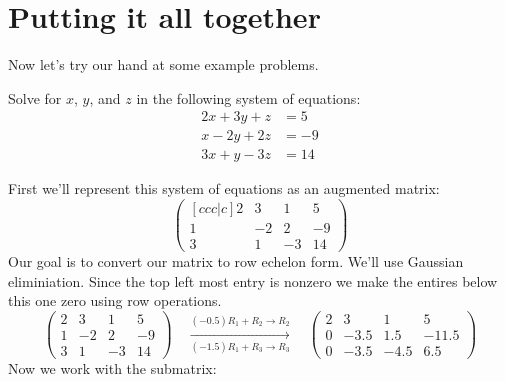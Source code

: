 \documentclass{ximera}
\begin{document}
\section{Putting it all together}

Now let's try our hand at some example problems.


\begin{example}
  Solve for $x$, $y$, and $z$ in the following system of equations:
  \begin{align*}
    2x + 3y + z  &= 5 \\
    x -2y+ 2z &=-9\\
    3x +y- 3z &=14
  \end{align*}

\begin{explanation}
First we'll represent this system of equations as an augmented matrix:
\[
  \begin{pmatrix}[ccc|c]
    2 & 3 & 1 & 5 \\
    1 &  -2 & 2 &-9 \\
    3 &  1 & -3 & 14
  \end{pmatrix}
\]
Our goal is to convert our matrix to row echelon form. We'll use
Gaussian eliminiation. Since the top left most entry is nonzero we
make the entires below this one zero using row operations.
\[
  \begin{pmatrix}
    2 & 3 & 1 & 5 \\
    1 &  -2 & 2 &-9 \\
    3 &  1 & -3 & 14
  \end{pmatrix}
  \quad\xrightarrow[(-1.5) R_1 + R_3 \to R_3]{(-0.5) R_1 + R_2 \to R_2}\quad
  \begin{pmatrix}
    2 & 3 & 1 & 5 \\
    0 & -3.5 & 1.5 &-11.5 \\
    0 & -3.5 & -4.5 & 6.5
  \end{pmatrix}
\]
Now we work with the submatrix:
\begin{center}
\end{center}
\end{explanation}
\end{example}
\end{document}
